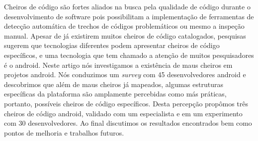 Cheiros de c\'odigo s\~ao fortes aliados na busca pela qualidade de c\'odigo durante o desenvolvimento de software pois possibilitam a implementa\c{c}\~ao de ferramentas de detec\c{c}\~ao autom\'atica de trechos de c\'odigos problem\'aticos ou mesmo a inspe\c{c}\~ao manual. Apesar de j\'a existirem muitos cheiros de c\'odigo catalogados, pesquisas sugerem que tecnologias diferentes podem apresentar cheiros de c\'odigo espec\'ificos, e uma tecnologia que tem chamado a aten\c{c}\~ao de muitos pesquisadores \'e o android. Neste artigo n\'os investigamos a exist\^encia de maus cheiros em projetos android. N\'os conduzimos um \textit{survey} com 45 desenvolvedores android e descobrimos que al\'em de maus cheiros j\'a mapeados, algumas estruturas espec\'ificas da plataforma s\~ao amplamente percebidas como m\'as pr\'aticas, portanto, poss\'iveis cheiros de c\'odigo espec\'ificos. Desta percep\c{c}\~ao prop\^omos tr\^es cheiros de c\'odigo android, validado com um especialista e em um experimento com 30 desenvolvedores. Ao final discutimos os resultados encontrados bem como pontos de melhoria e trabalhos futuros.